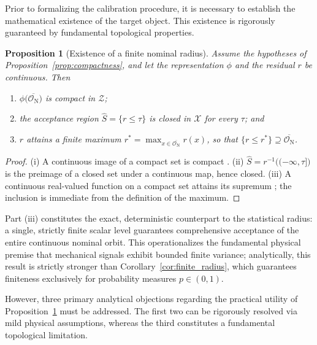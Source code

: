 \documentclass[a4paper]{cas-sc}
\newtheorem{proposition}{Proposition}
\newcommand{\X}{\ensuremath{\mathcal{X}}}
\newcommand{\Z}{\ensuremath{\mathcal{Z}}}
\newcommand{\residual}{\ensuremath{r}}
\begin{document}
Prior to formalizing the calibration procedure, it is necessary to establish the mathematical existence of the target object. This existence is rigorously guaranteed by fundamental topological properties.

\begin{proposition}[Existence of a finite nominal radius]
\label{prop:finite_nominal_radius}
Assume the hypotheses of Proposition~\ref{prop:compactness}, and let the
representation \(\phi\) and the residual \(\residual\) be continuous. Then
\begin{enumerate}[label=(\roman*),leftmargin=1.8em]
\item \(\phi\bigl(\overline{\mathcal{O}_{\mathrm N}}\bigr)\) is compact in
      \(\Z\);
\item the acceptance region \(\widehat{S}=\{\residual\le\tau\}\) is closed in
      \(\X\) for every \(\tau\); and
\item \(\residual\) attains a finite maximum
      \(\residual^{*}=\max_{x\in\overline{\mathcal{O}_{\mathrm N}}}\residual(x)\),
      so that \(\{\residual\le\residual^{*}\}\supseteq
      \overline{\mathcal{O}_{\mathrm N}}\).
\end{enumerate}
\end{proposition}

\begin{proof}
(i) A continuous image of a compact set is compact
\citep[Thm.~4.14]{rudin1976}. (ii) \(\widehat{S}=\residual^{-1}
\bigl((-\infty,\tau]\bigr)\) is the preimage of a closed set under a
continuous map, hence closed. (iii) A continuous real-valued function on a
compact set attains its supremum \citep[Thm.~4.16]{rudin1976}; the inclusion
is immediate from the definition of the maximum.
\end{proof}

Part (iii) constitutes the exact, deterministic counterpart to the statistical radius: a single, strictly finite scalar level guarantees comprehensive acceptance of the entire continuous nominal orbit. This operationalizes the fundamental physical premise that mechanical signals exhibit bounded finite variance; analytically, this result is strictly stronger than Corollary~\ref{cor:finite_radius}, which guarantees finiteness exclusively for probability measures \(p\in(0,1)\).

However, three primary analytical objections regarding the practical utility of Proposition~\ref{prop:finite_nominal_radius} must be addressed. The first two can be rigorously resolved via mild physical assumptions, whereas the third constitutes a fundamental topological limitation.
\end{document}

